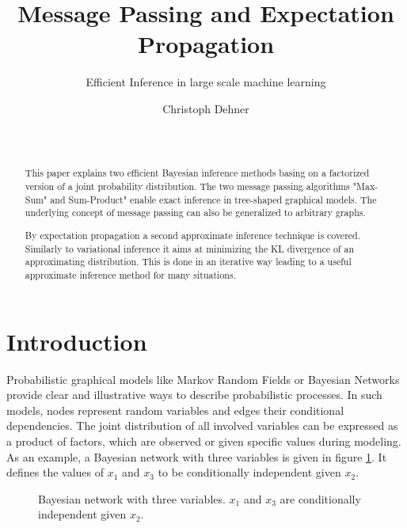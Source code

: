 \documentclass{sigkdd}
\title{Message Passing and Expectation Propagation}
\subtitle{Efficient Inference in large scale machine learning}
\author{
\alignauthor Christoph Dehner \\
\affaddr{Department of Informatics}\\
\affaddr{Technische Universit\"at M\"unchen}\\
\email{dehner@in.tum.de}
}
\begin{document}
\maketitle

\begin{abstract}
This paper explains two efficient Bayesian inference methods basing on a factorized version of a joint probability distribution. The two message passing algorithms "Max-Sum" and Sum-Product" enable exact inference in tree-shaped graphical models. The underlying concept of message passing can also be generalized to arbitrary graphs.

By expectation propagation a second approximate inference technique is covered. Similarly to variational inference it aims at minimizing the KL divergence of an approximating distribution. This is done in an iterative way leading to a useful approximate inference method for many situations.
\end{abstract}

\section{Introduction}
Probabilistic graphical models like Markov Random Fields or Bayesian Networks provide clear and illustrative ways to describe probabilistic processes. In such models, nodes represent random variables and edges their conditional dependencies. The joint distribution of all involved variables can be expressed as a product of factors, which are observed or given specific values during modeling. As an example, a Bayesian network with three variables is given in figure \ref{fig:BN}. It defines the values of $x_1$ and $x_3$ to be conditionally independent given $x_2$.
\begin{figure}[h]
	\centering
	\caption{Bayesian network with three variables. $x_1$ and $x_3$ are conditionally independent given $x_2$.}\label{fig:BN}
\end{figure}
\end{document}
